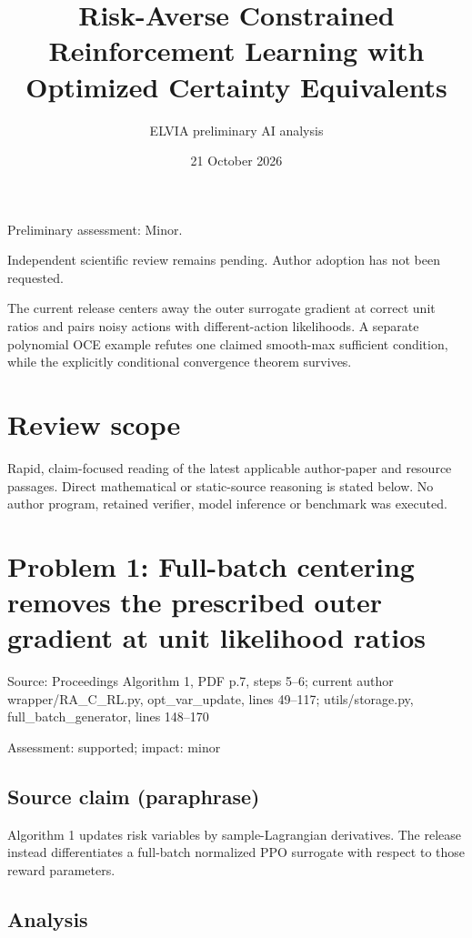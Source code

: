 \documentclass[11pt]{article}
\begin{document}
\title{Risk-Averse Constrained Reinforcement Learning with Optimized Certainty Equivalents}

\author{ELVIA preliminary AI analysis}\date{21 October 2026}\maketitle

Preliminary assessment: Minor.\par

Independent scientific review remains pending. Author adoption has not been requested.

The current release centers away the outer surrogate gradient at correct unit ratios and pairs noisy actions with different-action likelihoods. A separate polynomial OCE example refutes one claimed smooth-max sufficient condition, while the explicitly conditional convergence theorem survives.

\section*{Review scope}

Rapid, claim-focused reading of the latest applicable author-paper and resource passages. Direct mathematical or static-source reasoning is stated below. No author program, retained verifier, model inference or benchmark was executed.

\section*{Problem 1: Full-batch centering removes the prescribed outer gradient at unit likelihood ratios}

Source: Proceedings Algorithm 1, PDF p.7, steps 5–6; current author wrapper/RA\_C\_RL.py, opt\_var\_update, lines 49–117; utils/storage.py, full\_batch\_generator, lines 148–170

Assessment: supported; impact: minor

\subsection*{Source claim (paraphrase)}

Algorithm 1 updates risk variables by sample-Lagrangian derivatives. The release instead differentiates a full-batch normalized PPO surrogate with respect to those reward parameters.

\subsection*{Analysis}
\end{document}
